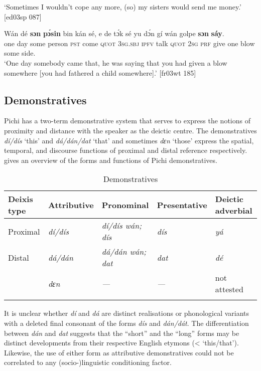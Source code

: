 \glt ‘Sometimes I wouldn’t cope any more, (so) my sisters would send me money.’ [ed03sp 087]
\z


\ea%
    \label{ex:key:191}
    \gll Wán    dé  \textbf{sɔn} \textbf{   pɔ́sin}  bin  kán    sé,    e    de
tɔ́k  sé    yu  dɔ́n  gí  wán    golpe  \textbf{sɔn} \textbf{    sáy}.\\
one    day  some  person  \textsc{pst}  come  \textsc{quot}    \textsc{3sg.sbj}  \textsc{ipfv}
talk  \textsc{quot}    \textsc{2sg}  \textsc{prf}  give  one    blow  some  side.\\

\glt ‘One day somebody came that, he was saying that you had given a blow
somewhere [you had fathered a child somewhere].’ [fr03wt 185]
\z

\subsection{Demonstratives}

Pichi has a two-term demonstrative system that serves to express the notions of proximity and distance with the speaker as the deictic centre. The demonstratives \textit{dí/dís} ‘this’ and \textit{dá/dán/dat} ‘that’ and sometimes \textit{dɛn} ‘those’ express the spatial, temporal, and discourse functions of proximal and distal reference respectively.  gives an overview of the forms and functions of Pichi demonstratives.

\begin{table}
\caption{Demonstratives}
\label{tab:key:5.2}

\begin{tabular}{lllll}
\lsptoprule
Deixis type & Attributive & Pronominal & Presentative & Deictic adverbial\\
\midrule
Proximal & \itshape dí/dís & \itshape dí/dís wán; dís & \itshape dís & \itshape yá\\
Distal & \itshape dá/dán & \itshape dá/dán wán; dat & \itshape dat & \itshape dé\\
& \itshape dɛn & \itshape — & \itshape {}--- & not attested\\
\lspbottomrule
\end{tabular}
\end{table}

It is unclear whether \textit{dí} and \textit{dá} are distinct realisations or phonological variants with a deleted final consonant of the forms \textit{dís} and \textit{dán/dát}. The differentiation between \textit{dán} and \textit{dat} suggests that the “short” and the “long” forms may be distinct developments from their respective English etymons (< ‘this/that’). Likewise, the use of either form as attributive demonstratives could not be correlated to any (socio-)linguistic conditioning factor. 


